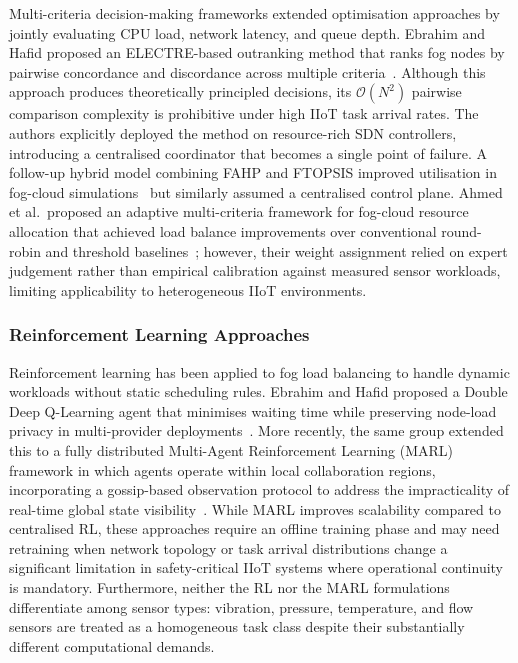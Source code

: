 \documentclass[conference]{IEEEtran}
\begin{document}
Multi-criteria decision-making frameworks extended optimisation approaches by jointly evaluating CPU load, network latency, and queue depth. Ebrahim and Hafid proposed an ELECTRE-based outranking method that ranks fog nodes by pairwise concordance and discordance across multiple criteria~\cite{ebrahim2023b}. Although this approach produces theoretically principled decisions, its $\mathcal{O}(N^2)$ pairwise comparison complexity is prohibitive under high IIoT task arrival rates. The authors explicitly deployed the method on resource-rich SDN controllers, introducing a centralised coordinator that becomes a single point of failure. A follow-up hybrid model combining FAHP and FTOPSIS improved utilisation in fog-cloud simulations~\cite{ahmed2024} but similarly assumed a centralised control plane. Ahmed et al.\ proposed an adaptive multi-criteria framework for fog-cloud resource allocation that achieved load balance improvements over conventional round-robin and threshold baselines~\cite{alshafei2023}; however, their weight assignment relied on expert judgement rather than empirical calibration against measured sensor workloads, limiting applicability to heterogeneous IIoT environments.

\subsubsection{Reinforcement Learning Approaches}

Reinforcement learning has been applied to fog load balancing to handle dynamic workloads without static scheduling rules. Ebrahim and Hafid proposed a Double Deep Q-Learning agent that minimises waiting time while preserving node-load privacy in multi-provider deployments~\cite{ebrahim2023a}. More recently, the same group extended this to a fully distributed Multi-Agent Reinforcement Learning (MARL) framework in which agents operate within local collaboration regions, incorporating a gossip-based observation protocol to address the impracticality of real-time global state visibility~\cite{ebrahim2025}. While MARL improves scalability compared to centralised RL, these approaches require an offline training phase and may need retraining when network topology or task arrival distributions change a significant limitation in safety-critical IIoT systems where operational continuity is mandatory. Furthermore, neither the RL nor the MARL formulations differentiate among sensor types: vibration, pressure, temperature, and flow sensors are treated as a homogeneous task class despite their substantially different computational demands.
\end{document}
